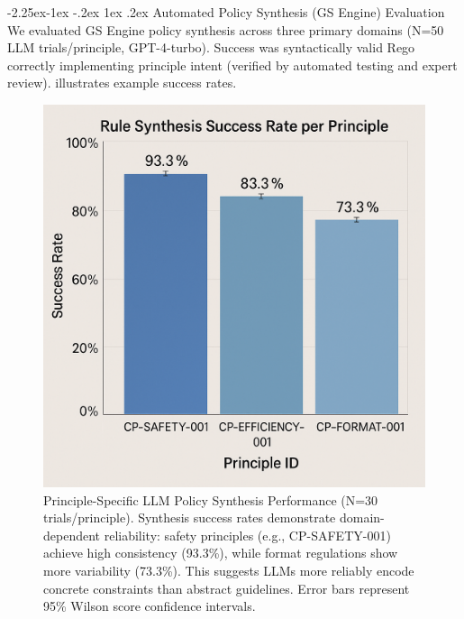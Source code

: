 \documentclass[manuscript,screen,review,anonymous,9pt]{acmart}
\makeatletter
\renewcommand\subsection{\@startsection{subsection}{2}{\z@}%
  {-2.25ex\@plus -1ex \@minus -.2ex}%
  {1ex \@plus .2ex}%
  {\normalfont\large\bfseries}}
\makeatother
\begin{document}
\subsection{Automated Policy Synthesis (GS Engine) Evaluation}
\label{sec:synthesis_evaluation}
We evaluated GS Engine policy synthesis across three primary domains (N=50 LLM trials/principle, GPT-4-turbo). Success was syntactically valid Rego correctly implementing principle intent (verified by automated testing and expert review).  illustrates example success rates.

\begin{figure}[htbp]
\centering
\includegraphics[width=\linewidth,keepaspectratio]{figs/Figure_3_Rule_Synthesis_Success_Rate_per_Principle.png}
\caption[Principle-Specific LLM Policy Synthesis Performance]{Principle-Specific LLM Policy Synthesis Performance (N=30 trials/principle). Synthesis success rates demonstrate domain-dependent reliability: safety principles (e.g., CP-SAFETY-001) achieve high consistency (93.3\%), while format regulations show more variability (73.3\%). This suggests LLMs more reliably encode concrete constraints than abstract guidelines. Error bars represent 95\% Wilson score confidence intervals.}
\label{fig:rule_synthesis_chart}
\end{figure}
\end{document}
